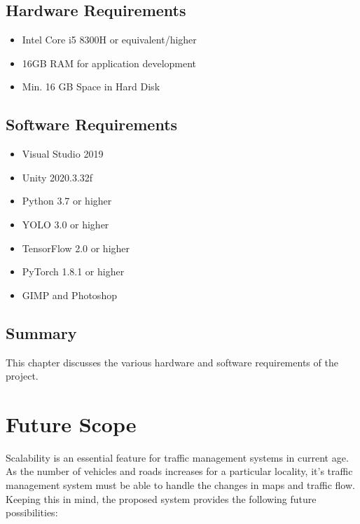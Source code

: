 \documentclass[openany,12pt]{report}
\begin{document}
	\newpage
	\section{Hardware Requirements}
	\begin{itemize}
		\item{Intel Core i5 8300H or equivalent/higher}
		\item{16GB RAM for application development}
		\item{Min. 16 GB Space in Hard Disk}
	\end{itemize}
	
	\section{Software Requirements}
	\begin{itemize}
		\item{Visual Studio 2019}
		\item{Unity 2020.3.32f}
		\item{Python 3.7 or higher}
		\item{YOLO 3.0 or higher}
		\item{TensorFlow 2.0 or higher}
		\item{PyTorch 1.8.1 or higher}
		\item{GIMP and Photoshop}
	\end{itemize}
	
	\section{Summary}
	\hspace*{0.5in}This chapter discusses the various hardware and software requirements of the project.
	\chapter {Future Scope}
	
	\hspace{0.5in}Scalability is an essential feature for traffic management systems in current age. As the number of vehicles and roads increases for a particular locality, it's traffic management system must be able to handle the changes in maps and traffic flow. Keeping this in mind, the proposed system provides the following future possibilities:\\
	
\end{document}
